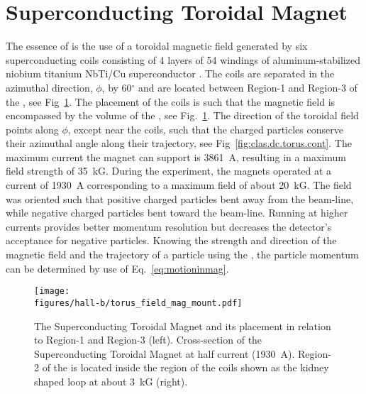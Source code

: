 \section{Superconducting Toroidal Magnet}\label{sec:clas.tor}

The essence of  is the use of a toroidal magnetic field generated by six superconducting coils consisting of 4 layers of 54 windings of aluminum-stabilized niobium titanium NbTi/Cu superconductor \cite{clas}. The coils are separated in the azimuthal direction, $\phi$, by 60$^\circ$ and are located between Region-1 and Region-3 of the , see Fig~\ref{fig:clas.dc.torus.mag}. The placement of the coils is such that the magnetic field is encompassed by the volume of the , see Fig.~\ref{fig:clas.dc.torus.mag}. The direction of the toroidal field points along $\phi$, except near the coils,  such that the charged particles conserve their azimuthal angle along their trajectory, see Fig~\ref{fig:clas.dc.torus.cont}. The maximum current the magnet can support is 3861~A, resulting in a maximum field strength of 35~kG. During the  experiment, the magnets operated at a current of 1930~A corresponding to a maximum field of about 20~kG. The field was oriented such that positive charged particles bent away from the beam-line, while negative charged particles bent toward the beam-line. Running at higher currents provides better momentum resolution but decreases the detector's acceptance for negative particles. Knowing the strength and direction of the magnetic field and the trajectory of a particle using the , the particle momentum can be determined by use of Eq.~\ref{eq:motioninmag}.

\begin{figure}[h!]\begin{center}
\texttt{[image: \\figures/hall-b/torus\_field\_mag\_mount.pdf]}
\caption[The  Superconducting Toroidal Magnet and its placement in relation to Region-1 and Region-3]{\label{fig:clas.dc.torus.mag}The  Superconducting Toroidal Magnet and its placement in relation to Region-1 and Region-3  (left). Cross-section of the  Superconducting Toroidal Magnet at half current (1930~A). Region-2 of the  is located inside the region of the coils shown as the kidney shaped loop at about 3~kG (right).}
\end{center}\end{figure}


